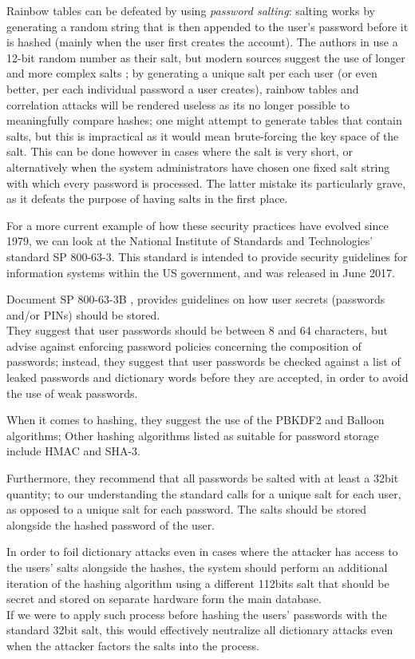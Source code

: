 Rainbow tables can be defeated by using \emph{password salting}: salting works by generating a random string that is then appended to the user's password before it is hashed (mainly when the user first creates the account). The authors in \cite{Thompson1979} use a 12-bit random number as their salt, but modern sources suggest the use of longer and more complex salts \cite{NIST_2017}; by generating a unique salt per each user (or even better, per each individual password a user creates), rainbow tables and correlation attacks will be rendered useless as its no longer possible to meaningfully compare hashes; one might attempt to generate tables that contain salts, but this is impractical as it would mean brute-forcing the key space of the salt.
This can be done however in cases where the salt is very short, or alternatively when the system administrators have chosen one fixed salt string with which every password is processed.
The latter mistake its particularly grave, as it defeats the purpose of having salts in the first place.
   
For a more current example of how these security practices have evolved since 1979, we can look at the National Institute of Standards and Technologies' standard SP 800-63-3.
This standard is intended to provide security guidelines for information systems within the US government, and was released in June 2017.

Document SP 800-63-3B \cite{NIST_2017}, provides guidelines on how user secrets (passwords and/or PINs) should be stored.\\
They suggest that user passwords should be between 8 and 64 characters, but advise against enforcing password policies concerning the composition of passwords; instead, they suggest that user passwords be checked against a list of leaked passwords and dictionary words before they are accepted, in order to avoid the use of weak passwords.

When it comes to hashing, they suggest the use of the PBKDF2 and Balloon algorithms; Other hashing algorithms listed as suitable for password storage include HMAC and SHA-3.

Furthermore, they recommend that all passwords be salted with at least a 32bit quantity; to our understanding the standard calls for a unique salt for each user, as opposed to a unique salt for each password. The salts should be stored alongside the hashed password of the user.

In order to foil dictionary attacks even in cases where the attacker has access to the users' salts alongside the hashes, the system should perform an additional iteration of the hashing algorithm using a different 112bits salt that should be secret and stored on separate hardware form the main database.\\
If we were to apply such process before hashing the users' passwords with the standard 32bit salt, this would effectively neutralize all dictionary attacks even when the attacker factors the salts into the process.

